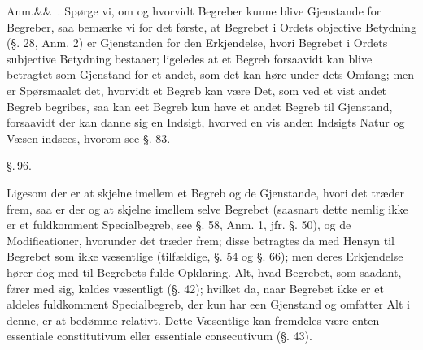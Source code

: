 \documentclass[12pt]{book}
\def\sperr#1{#1}%
\def\textit#1{#1}%
\def\emph#1{#1}%
\newcommand{\sperr}[1]{\textls[180]{#1}}
\newcommand{\parag}[1]{%
  \par\vspace{0.9\baselineskip}%
  {\centering\textit{\S.\,#1.}\par}%
  \vspace{0.35\baselineskip}%
  \noindent\hspace{\parindent}\ignorespaces
}
\newcommand{\anm}[1]{%
  \par\vspace{0.5\baselineskip}%
  \noindent\hspace{\parindent}\sperr{Anm.}\ifx&#1&\else~\textit{#1}.\fi
  \enspace\ignorespaces
}
\newcommand{\opage}[1]{\marginnote{\footnotesize\textit{[#1]}}}
\begin{document}
\anm{} Spørge vi, om og hvorvidt Begreber kunne blive Gjenstande for Begreber, saa
bemærke vi for det første, at Begrebet i Ordets objective Betydning (§. 28, Anm. 2) er
Gjenstanden for den Erkjendelse, hvori Begrebet i Ordets subjective Betydning bestaaer;
ligeledes at et Begreb forsaavidt kan blive betragtet som Gjenstand for et andet, som
det kan høre under dets Omfang; men er Spørsmaalet det, hvorvidt et Begreb kan være
Det, som ved et vist andet Begreb begribes, saa kan eet Begreb kun have et andet Begreb
til Gjenstand, forsaavidt der kan danne sig en Indsigt, hvorved en vis anden Indsigts
Natur og Væsen indsees, hvorom see §. 83.

\parag{96}

Ligesom der er at skjelne imellem et Begreb og de Gjenstande, hvori det træder frem,
saa er der og at skjelne imellem selve Begrebet (saasnart dette nemlig ikke er et
fuldkomment Specialbegreb, see §. 58, Anm. 1, jfr. §. 50), og de Modificationer,
hvorunder det træder frem; disse betragtes da med Hensyn til Begrebet som ikke
\emph{væsentlige} (\emph{tilfældige}, §. 54 og §. 66); men deres Erkjendelse hører dog
med til Begrebets fulde Opklaring. Alt, hvad Begrebet, som saadant, fører med sig,
kaldes \emph{væsentligt} (§. 42); hvilket da, naar Begrebet ikke er et aldeles
fuldkomment Specialbegreb, der kun har een Gjenstand
\opage{241}og omfatter Alt i denne, er at bedømme relativt. Dette Væsentlige kan fremdeles være
enten \textit{essentiale constitutivum} eller \textit{essentiale consecutivum} (§. 43).
\end{document}
